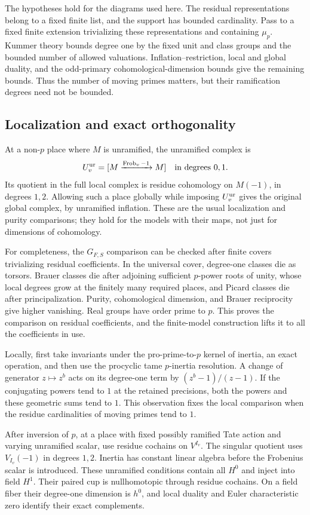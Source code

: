 The hypotheses hold for the diagrams used here.  The residual
representations belong to a fixed finite list, and the support has
bounded cardinality.  Pass to a fixed finite extension trivializing
these representations and containing $\mu_p$.  Kummer theory bounds
degree one by the fixed unit and class groups and the bounded number
of allowed valuations.  Inflation--restriction, local and global
duality, and the odd-primary cohomological-dimension bounds give the
remaining bounds.  Thus the number of moving primes matters, but
their ramification degrees need not be bounded.

\subsection{Localization and exact orthogonality}

At a non-$p$ place where $M$ is unramified, the unramified complex is
\[
 U_v^{\rm ur}=[M\xrightarrow{\operatorname{Frob}_v-1}M]\quad\text{in degrees }0,1.
\]
Its quotient in the full local complex is residue cohomology on
$M(-1)$, in degrees $1,2$.  Allowing such a place globally while imposing
$U_v^{\rm ur}$ gives the original global complex, by unramified
inflation.  These are the usual localization and purity comparisons;
they hold for the models with their maps, not just for dimensions of
cohomology.

For completeness, the $G_{F,S}$ comparison can be checked after finite
covers trivializing residual coefficients.  In the universal cover,
degree-one classes die as torsors.  Brauer classes die after adjoining
sufficient $p$-power roots of unity, whose local degrees grow at the
finitely many required places, and Picard classes die after
principalization.  Purity, cohomological dimension, and Brauer
reciprocity give higher vanishing.  Real groups have order prime to
$p$.  This proves the comparison on residual coefficients, and the
finite-model construction lifts it to all the coefficients in use.

Locally, first take invariants under the pro-prime-to-$p$ kernel of
inertia, an exact operation, and then use the procyclic tame
$p$-inertia resolution.  A change of generator $z\mapsto z^b$ acts on
its degree-one term by $(z^b-1)/(z-1)$.  If the conjugating powers tend
to $1$ at the retained precisions, both the powers and these geometric
sums tend to $1$.  This observation fixes the local comparison when
the residue cardinalities of moving primes tend to $1$.

After inversion of $p$, at a place with fixed possibly ramified Tate
action and varying unramified scalar, use residue cochains on $V^{I_v}$.
The singular quotient uses $V_{I_v}(-1)$ in degrees $1,2$.  Inertia has
constant linear algebra before the Frobenius scalar is introduced.
These unramified conditions contain all $H^0$ and inject into field
$H^1$.  Their paired cup is nullhomotopic through residue cochains.
On a field fiber their degree-one dimension is $h^0$, and local
duality and Euler characteristic zero identify their exact
complements.

